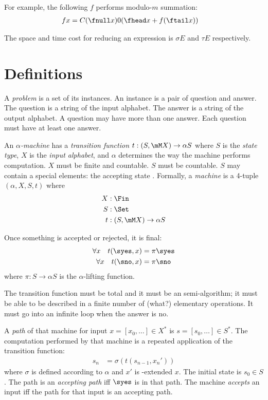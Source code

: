 For example, the following $f$ performs modulo-$m$ summation:
\begin{align}
     fx &= C (\fnull x) 0 (\fhead x + f(\ftail x))
\end{align}

The space and time cost for reducing an expression is $\sigma E$ and $\tau E$ respectively.

\section{Definitions}

A \emph{problem} is a set of its instances.
An instance is a pair of question and answer.
The question is a string of the input alphabet.
The answer is a string of the output alphabet.
A question may have more than one answer.
Each question must have at least one answer.

An \emph{$\alpha$-machine} has a \emph{transition function}
$t : (S,\mM X) \to \alpha S$
where $S$ is the \emph{state type},
$X$ is the \emph{input alphabet},
and $\alpha$ determines the way the machine performs computation.
$X$ must be finite and countable.
$S$ must be countable.
$S$ may contain a special elements:
the accepting state \syes.
Formally, a \emph{machine} is a 4-tuple $(\alpha,X,S,t)$ where
\begin{align}
    X &: \Fin
 \\ S &: \Set
 \\ t &: (S,\mM X) \to \alpha S
\end{align}

Once something is accepted or rejected, it is final:
\begin{align}
    \forall x \quad t (\syes,x) &= \pi \syes
  \\ \forall x \quad t (\sno,x) &= \pi \sno
\end{align}
where $\pi : S \to \alpha S$ is the $\alpha$-lifting function.

The transition function must be total
and it must be an semi-algorithm;
it must be able to be described
in a finite number of (what?) elementary operations.
It must go into an infinite loop when the answer is no.

A \emph{path} of that machine for input $x = [x_0,\ldots] \in X^*$ is $s = [s_0,\ldots] \in S^*$.
The computation performed by that machine is a repeated application of the transition function:
\begin{align*}
    s_n &= \sigma (t (s_{n-1}, x_n'))
\end{align*}
where $\sigma$ is defined according to $\alpha$
and $x'$ is \mM-extended $x$.
The initial state is $s_0 \in S$.
The path is an \emph{accepting path} iff $\syes$ is in that path.
The machine \emph{accepts} an input iff the path for that input is an accepting path.

